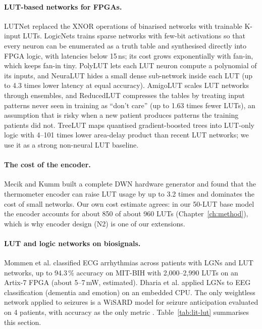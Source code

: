 \paragraph{LUT-based networks for FPGAs.} LUTNet \cite{wang2019lutnet} replaced the XNOR operations of binarised
networks with trainable K-input LUTs. LogicNets \cite{umuroglu2020logicnets} trains sparse networks with few-bit
activations so that every neuron can be enumerated as a truth table and synthesised directly into FPGA logic, with
latencies below 15\,ns; its cost grows exponentially with fan-in, which keeps fan-in tiny. PolyLUT
\cite{andronic2023polylut} lets each LUT neuron compute a polynomial of its inputs, and NeuraLUT
\cite{andronic2024neuralut} hides a small dense sub-network inside each LUT (up to 4.3 times lower latency at equal
accuracy). AmigoLUT \cite{weng2025amigolut} scales LUT networks through ensembles, and ReducedLUT
\cite{cassidy2025reducedlut} compresses the tables by treating input patterns never seen in training as ``don't care''
(up to 1.63 times fewer LUTs), an assumption that is risky when a new patient produces patterns the training patients
did not. TreeLUT \cite{khataei2025treelut} maps quantised gradient-boosted trees into LUT-only logic with 4--101 times
lower area-delay product than recent LUT networks; we use it as a strong non-neural LUT baseline.

\paragraph{The cost of the encoder.} Mecik and Kumm \cite{mecik2025thermo} built a complete DWN hardware generator and
found that the thermometer encoder can raise LUT usage by up to 3.2 times and dominates the cost of small networks.
Our own cost estimate agrees: in our 50-LUT base model the encoder accounts for about 850 of about 960 LUTs
(Chapter~\ref{ch:method}), which is why encoder design (N2) is one of our extensions.

\paragraph{LUT and logic networks on biosignals.} Mommen et al. \cite{mommen2026ecg} classified ECG arrhythmias
across patients with LGNs and LUT networks, up to 94.3\,\% accuracy on MIT-BIH with 2,000--2,990 LUTs on an Artix-7
FPGA (about 5--7\,mW, estimated). Dharia et al. \cite{dharia2026eeglgn} applied LGNs to EEG classification (dementia
and emotion) on an embedded CPU. The only weightless network applied to seizures is a WiSARD model for seizure
anticipation evaluated on 4 patients, with accuracy as the only metric \cite{deaguiar2015wisard}.
Table~\ref{tab:lit-lut} summarises this section.

